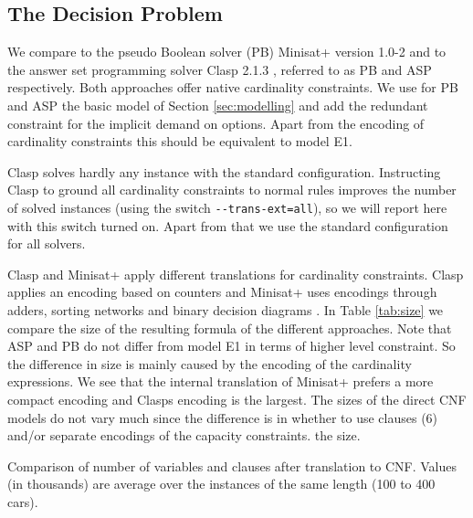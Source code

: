 \documentclass[]{llncs}
\begin{document}
\subsection{The Decision Problem}

We compare to the pseudo Boolean solver (PB) Minisat+ version 1.0-2 \cite{Een06} and to the answer set programming
solver Clasp 2.1.3 \cite{Gebser07}, referred to as PB and ASP respectively. Both approaches offer native cardinality
constraints. We use for PB and ASP the basic model of Section \ref{sec:modelling} and add the redundant constraint for
the implicit demand on options. Apart from the encoding of cardinality constraints this should be equivalent to model
E1. 
      
Clasp solves hardly any instance with the standard configuration. Instructing Clasp to ground all cardinality
constraints to normal rules improves the number of solved instances (using the switch \verb+--trans-ext=all+), so we
will report here with this switch turned on. Apart from that we use the standard configuration for all solvers. 

Clasp and Minisat+ apply different translations for cardinality constraints. Clasp applies an encoding based on counters
and Minisat+ uses encodings through adders, sorting networks and binary decision diagrams \cite{Een06}. In Table
\ref{tab:size} we compare the size of the resulting formula of the different approaches.  Note that ASP and PB do not
differ from model E1 in terms of higher level constraint. So the difference in size is mainly caused by the encoding of
the cardinality expressions. We see that the internal translation of Minisat+ prefers a more compact encoding  and
Clasps encoding is the largest. The sizes of the direct CNF models do not vary much since the difference is in whether
to use clauses (6) and/or separate encodings of the capacity constraints. %
the size. 

\begin{table}[htbp] 
    \caption{Comparison of number of variables and clauses after translation to CNF. Values (in thousands) are average
    over the instances of the same length (100 to 400 cars).} 
    \centering
    
    \label{tab:size}
\end{table}
\end{document}

